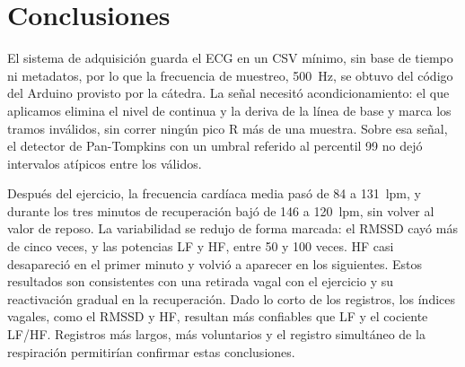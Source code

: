 \section{Conclusiones}
\label{sec:conclusiones}

El sistema de adquisición guarda el ECG en un CSV mínimo, sin base de tiempo ni metadatos, por lo que la frecuencia de muestreo, \SI{500}{\hertz}, se obtuvo del código del Arduino provisto por la cátedra. La señal necesitó acondicionamiento: el que aplicamos elimina el nivel de continua y la deriva de la línea de base y marca los tramos inválidos, sin correr ningún pico R más de una muestra. Sobre esa señal, el detector de Pan-Tompkins con un umbral referido al percentil 99 no dejó intervalos atípicos entre los válidos.

Después del ejercicio, la frecuencia cardíaca media pasó de 84 a \SI{131}{lpm}, y durante los tres minutos de recuperación bajó de 146 a \SI{120}{lpm}, sin volver al valor de reposo. La variabilidad se redujo de forma marcada: el RMSSD cayó más de cinco veces, y las potencias LF y HF, entre 50 y 100 veces. HF casi desapareció en el primer minuto y volvió a aparecer en los siguientes. Estos resultados son consistentes con una retirada vagal con el ejercicio y su reactivación gradual en la recuperación. Dado lo corto de los registros, los índices vagales, como el RMSSD y HF, resultan más confiables que LF y el cociente LF/HF. Registros más largos, más voluntarios y el registro simultáneo de la respiración permitirían confirmar estas conclusiones.
